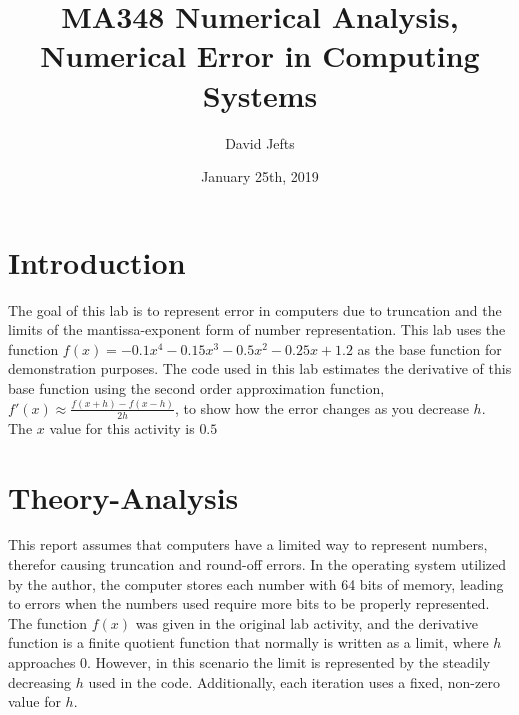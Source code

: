 \documentclass[12pt, letterpaper]{article}
\begin{document}
\setcounter{secnumdepth}{-1}

\title{MA348 Numerical Analysis, Numerical Error in Computing Systems}
\author{David Jefts}
\date{January 25th, 2019}
\begin{titlepage}
	\centering
	\maketitle
	\centering
	\hfill
	\vfill
\end{titlepage}

\setlength{\voffset}{-0.5in}
\setlength{\headsep}{10pt}

\section{Introduction}
	The goal of this lab is to represent error in computers due to truncation and the limits of the mantissa-exponent form of number representation. This lab uses the function $f(x)=-0.1x^4-0.15x^3-0.5x^2-0.25x+1.2$ as the base function for demonstration purposes. The code used in this lab estimates the derivative of this base function using the second order approximation function, $f'(x)\approx\frac{f(x+h)-f(x-h)}{2h}$, to show how the error changes as you decrease $h$. The $x$ value for this activity is $0.5$

\section{Theory-Analysis}
	This report assumes that computers have a limited way to represent numbers, therefor causing truncation and round-off errors. In the operating system utilized by the author, the computer stores each number with 64 bits of memory, leading to errors when the numbers used require more bits to be properly represented. The function $f(x)$ was given in the original lab activity, and the derivative function is a finite quotient function that normally is written as a limit, where $h$ approaches $0$. However, in this scenario the limit is represented by the steadily decreasing $h$ used in the code. Additionally, each iteration uses a fixed, non-zero value for $h$. 
\end{document}
